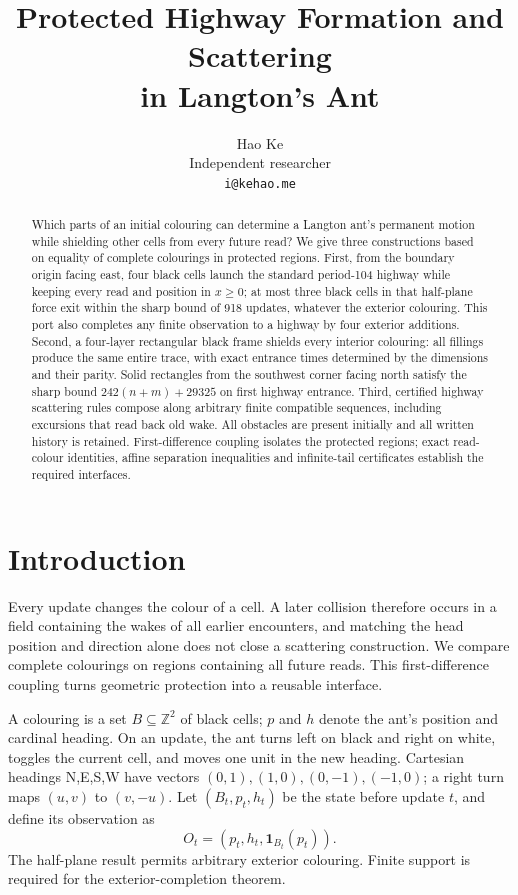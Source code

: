 \documentclass[11pt]{article}
\title{Protected Highway Formation and Scattering\\in Langton's Ant}
\author{Hao Ke\\Independent researcher\\\texttt{i@kehao.me}}
\date{}
\newcommand{\Z}{\mathbb Z}
\begin{document}
\maketitle
\begin{abstract}
Which parts of an initial colouring can determine a Langton ant's permanent
motion while shielding other cells from every future read? We give three
constructions based on equality of complete colourings in protected regions.
First, from the boundary origin facing east, four black cells launch the
standard period-104 highway while keeping every read and position in $x\ge0$;
at most three black cells in that half-plane force exit within the sharp bound
of 918 updates, whatever the exterior colouring. This port also
completes any finite observation to a highway by four exterior additions.
Second, a four-layer rectangular black frame shields every interior colouring:
all fillings produce the same entire trace, with exact entrance times determined
by the dimensions and their parity. Solid rectangles from the southwest corner
facing north satisfy the sharp bound $242(n+m)+29325$ on first highway entrance.
Third, certified highway scattering rules compose along arbitrary finite compatible
sequences, including excursions that read back old wake. All obstacles are present
initially and all written history is retained. First-difference coupling isolates
the protected regions; exact read-colour identities, affine separation inequalities
and infinite-tail certificates establish the required interfaces.
\end{abstract}

\section{Introduction}
Every update changes the colour of a cell. A later collision therefore occurs
in a field containing the wakes of all earlier encounters, and matching the
head position and direction alone does not close a scattering construction.
We compare complete colourings on regions containing all future reads. This
first-difference coupling turns geometric protection into a reusable interface.

A colouring is a set $B\subseteq\Z^2$ of black cells; $p$ and $h$ denote the
ant's position and cardinal heading. On an update, the ant turns left on
black and right on white, toggles the current cell, and moves one unit in the
new heading. Cartesian headings N,E,S,W have vectors
$(0,1),(1,0),(0,-1),(-1,0)$; a right turn maps $(u,v)$ to $(v,-u)$. Let $(B_t,p_t,h_t)$ be the state before update $t$, and define
its observation as
\[
 O_t=(p_t,h_t,\mathbf1_{B_t}(p_t)).
\]
The half-plane result permits arbitrary exterior colouring. Finite support
is required for the exterior-completion theorem.
\end{document}
